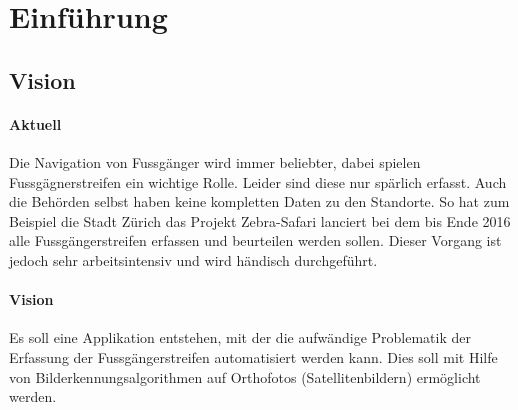 \section{Einführung}
\subsection{Vision}
\label{subsec:vision}
\paragraph{Aktuell}
Die Navigation von Fussgänger wird immer beliebter, dabei spielen Fussgägnerstreifen ein wichtige Rolle. Leider sind diese nur spärlich erfasst. Auch die Behörden selbst haben keine kompletten Daten zu den Standorte. So hat zum Beispiel die Stadt Zürich das Projekt Zebra-Safari lanciert bei dem bis Ende 2016 alle Fussgängerstreifen erfassen und beurteilen werden sollen. Dieser Vorgang ist jedoch sehr arbeitsintensiv und wird händisch durchgeführt.\\

\paragraph{Vision} 
Es soll eine Applikation entstehen, mit der die aufwändige Problematik der Erfassung der Fussgängerstreifen automatisiert werden kann. Dies soll mit Hilfe von Bilderkennungsalgorithmen auf Orthofotos (Satellitenbildern) ermöglicht werden. 